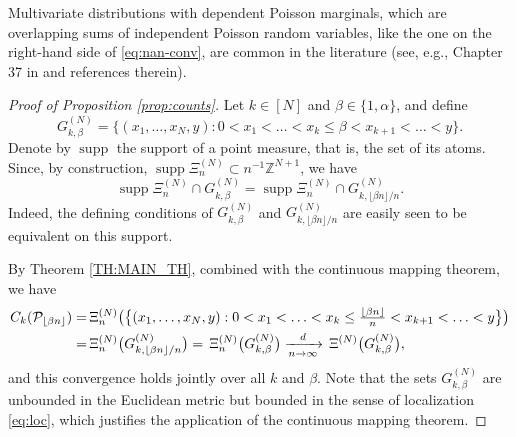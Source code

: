 \documentclass[11pt]{article}
\newcommand{\1}[1][]{
	\ifx&#1&\mathds{1}
	\else\mathds{1}\left\{#1\right\}\fi}
\newcommand{\Pc}{\mathcal{P}}
\DeclareMathOperator{\supp}{supp}
\DeclarePairedDelimiter\floor{\lfloor}{\rfloor}
\theoremstyle{definition}
\theoremstyle{remark}
\numberwithin{equation}{section}
\begin{document}
	Multivariate distributions with dependent Poisson marginals, which are overlapping sums of
	independent Poisson random variables, like the one on the right-hand side of \eqref{eq:nan-conv},
	are common in the literature (see, e.g., Chapter 37 in \cite{JKB97} and references therein).
	
	\begin{proof}[Proof of Proposition \ref{prop:counts}]
		Let $k \in [N]$ and $\beta \in \{1, \alpha\}$, and define 
		\begin{equation*}
			G^{(N)}_{k, \beta} = \bigl\{(x_1,\ldots,x_N,y):
			0 < x_1 < \ldots < x_k \le \beta < x_{k+1} < \ldots < y \bigr\}.
		\end{equation*}
		Denote by $\supp$ the support of a point measure, that is, the set of its atoms. Since, by construction, $\supp\Xi_n^{(N)}\subset n^{-1}\mathbb{Z}^{N+1}$, we have \[\supp \Xi_n^{(N)}\cap G^{(N)}_{k,\beta}=\supp \Xi_n^{(N)}\cap G^{(N)}_{k,\lfloor\beta n\rfloor/n}.\]
		Indeed, the defining conditions of $G^{(N)}_{k,\beta}$ and $G^{(N)}_{k,\lfloor\beta n\rfloor/n}$ are easily seen to be equivalent on this support.

		By Theorem \ref{TH:MAIN_TH}, combined with the continuous mapping theorem, we have
		\begin{align*}
			C_k(\Pc_{\floor{\beta n}})=\,&\Xi_n^{(N)}\bigl(\bigl\{(x_1,\ldots,x_N,y):
			0 < x_1 < \ldots < x_k \le \tfrac{\floor{\beta n}}{n} < x_{k+1} < \ldots < y \bigr\}\bigr) \\
			=\,&\Xi_n^{(N)}\bigl(G^{(N)}_{k,\lfloor\beta n\rfloor/n}\bigr)
				=\,\Xi_n^{(N)}\bigl(G^{(N)}_{k, \beta}\bigr)
			\xrightarrow[n\to\infty]{d} \, \Xi^{(N)}\bigl(G^{(N)}_{k, \beta}\bigr),
		\end{align*}
		and this convergence holds jointly over all $k$ and $\beta$.
		Note that the sets $G^{(N)}_{k, \beta}$ are unbounded in the Euclidean metric but bounded
		in the sense of localization \eqref{eq:loc}, which justifies the application of the continuous mapping theorem. 
		

\end{proof}
\end{document}
